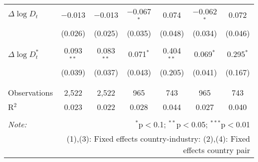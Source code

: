 \begin{tabular}{@{\extracolsep{5pt}}lcccccc}
 $\Delta \log D_t$ & $-$0.013 & $-$0.013 & $-$0.067$^{*}$ & 0.074 & $-$0.062$^{*}$ & 0.072 \\ 
  & (0.026) & (0.025) & (0.035) & (0.048) & (0.034) & (0.046) \\ 
  & & & & & & \\ 
 $\Delta \log D_t^*$ & 0.093$^{**}$ & 0.083$^{**}$ & 0.071$^{*}$ & 0.404$^{**}$ & 0.069$^{*}$ & 0.295$^{*}$ \\ 
  & (0.039) & (0.037) & (0.043) & (0.205) & (0.041) & (0.167) \\ 
  & & & & & & \\ 
\hline \\[-1.8ex] 
Observations & 2,522 & 2,522 & 965 & 743 & 965 & 743 \\ 
R$^{2}$ & 0.023 & 0.022 & 0.028 & 0.044 & 0.027 & 0.040 \\ 
\hline 
\hline \\[-1.8ex] 
\textit{Note:}  & \multicolumn{6}{r}{$^{*}$p$<$0.1; $^{**}$p$<$0.05; $^{***}$p$<$0.01} \\ 
 & \multicolumn{6}{r}{(1),(3): Fixed effects country-industry: (2),(4): Fixed effects country pair} \\ 
\end{tabular} 
